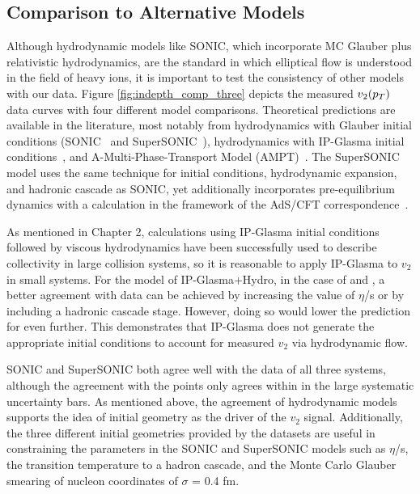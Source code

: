 \subsection{Comparison to Alternative Models}%
Although hydrodynamic models like SONIC, which incorporate MC Glauber plus relativistic hydrodynamics, are the standard in which elliptical flow is understood in the field of heavy ions, it is important to test the consistency of other models with our data. Figure \ref{fig:indepth_comp_three} depicts the measured $v_2(\mbox{$p_T$})$ data curves with four different model comparisons. Theoretical predictions are available in the literature, most notably from hydrodynamics with Glauber initial conditions (SONIC~\cite{Habich2015} and SuperSONIC~\cite{Romatschke2015}), hydrodynamics with IP-Glasma initial conditions~\cite{Schenke20141039}, and A-Multi-Phase-Transport Model (AMPT)~\cite{PhysRevC.72.064901}. The SuperSONIC model uses the same technique for initial conditions, hydrodynamic expansion, and hadronic cascade as SONIC, yet additionally incorporates pre-equilibrium dynamics with a calculation in the framework of the AdS/CFT correspondence~\cite{PhysRevLett.111.222302}.

As mentioned in Chapter 2, calculations using IP-Glasma initial conditions followed by viscous hydrodynamics have been successfully used to describe collectivity in large collision systems, so it is reasonable to apply IP-Glasma to $v_2$ in small systems. For the model of IP-Glasma+Hydro, in the case of \dau and \hau, a better agreement with data can be achieved by increasing the value of $\eta$/s or by including a hadronic cascade stage. However, doing so would lower the prediction for \pau even further. This demonstrates that IP-Glasma does not generate the appropriate initial conditions to account for measured $v_2$ via hydrodynamic flow.

SONIC and SuperSONIC both agree well with the data of all three systems, although the agreement with the \pau points only agrees within in the large systematic uncertainty bars. As mentioned above, the agreement of hydrodynamic models supports the idea of initial geometry as the driver of the $v_2$ signal. Additionally, the three different initial geometries provided by the datasets are useful in constraining the parameters in the SONIC and SuperSONIC models such as $\eta$/s, the transition temperature to a hadron cascade, and the Monte Carlo Glauber smearing of nucleon coordinates of $\sigma$ = 0.4 fm.

